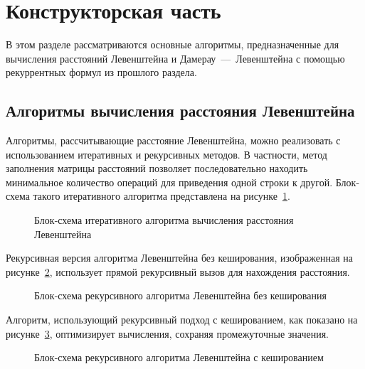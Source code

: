 \section{Конструкторская часть}

\noindent
\hspace{0.75cm}
В этом разделе рассматриваются основные алгоритмы, предназначенные для вычисления расстояний Левенштейна и Дамерау~---~Левенштейна с помощью рекуррентных формул из прошлого раздела.

\subsection{Алгоритмы вычисления расстояния Левенштейна}

\noindent
\hspace{0.75cm}
Алгоритмы, рассчитывающие расстояние Левенштейна, можно реализовать с использованием итеративных и рекурсивных методов. В частности, метод заполнения матрицы расстояний позволяет последовательно находить минимальное количество операций для приведения одной строки к другой. Блок-схема такого итеративного алгоритма представлена на рисунке~\ref{fig:l_matrix_design}.

\begin{figure}[H]
    \caption{Блок-схема итеративного алгоритма вычисления расстояния Левенштейна}
    \label{fig:l_matrix_design}
\end{figure}

\noindent
\hspace{0.75cm}
Рекурсивная версия алгоритма Левенштейна без кеширования, изображенная на рисунке~\ref{fig:l_recursion_basic}, использует прямой рекурсивный вызов для нахождения расстояния.

\begin{figure}[H]
    \caption{Блок-схема рекурсивного алгоритма Левенштейна без кеширования}
    \label{fig:l_recursion_basic}
\end{figure}

\noindent
\hspace{0.75cm}
Алгоритм, использующий рекурсивный подход с кешированием, как показано на рисунке~\ref{fig:l_recursion_optimized}, оптимизирует вычисления, сохраняя промежуточные значения.

\begin{figure}[H]
    \caption{Блок-схема рекурсивного алгоритма Левенштейна с кешированием}
    \label{fig:l_recursion_optimized}
\end{figure}

